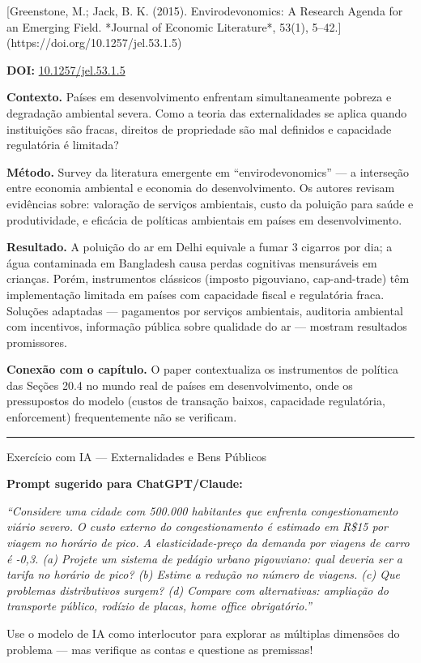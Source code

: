 \documentclass[11pt,twoside,openright]{book}
\begin{document}
\begin{pesquisabox}{[Greenstone, M.; Jack, B. K. (2015). Envirodevonomics: A Research Agenda for an Emerging Field. *Journal of Economic Literature*, 53(1), 5–42.](https://doi.org/10.1257/jel.53.1.5)}

\textbf{DOI:}
\href{https://doi.org/10.1257/jel.53.1.5}{10.1257/jel.53.1.5}

\textbf{Contexto.} Países em desenvolvimento enfrentam simultaneamente
pobreza e degradação ambiental severa. Como a teoria das externalidades
se aplica quando instituições são fracas, direitos de propriedade são
mal definidos e capacidade regulatória é limitada?

\textbf{Método.} Survey da literatura emergente em ``envirodevonomics''
--- a interseção entre economia ambiental e economia do desenvolvimento.
Os autores revisam evidências sobre: valoração de serviços ambientais,
custo da poluição para saúde e produtividade, e eficácia de políticas
ambientais em países em desenvolvimento.

\textbf{Resultado.} A poluição do ar em Delhi equivale a fumar 3
cigarros por dia; a água contaminada em Bangladesh causa perdas
cognitivas mensuráveis em crianças. Porém, instrumentos clássicos
(imposto pigouviano, cap-and-trade) têm implementação limitada em países
com capacidade fiscal e regulatória fraca. Soluções adaptadas ---
pagamentos por serviços ambientais, auditoria ambiental com incentivos,
informação pública sobre qualidade do ar --- mostram resultados
promissores.

\textbf{Conexão com o capítulo.} O paper contextualiza os instrumentos
de política das Seções 20.4 no mundo real de países em desenvolvimento,
onde os pressupostos do modelo (custos de transação baixos, capacidade
regulatória, enforcement) frequentemente não se verificam.

\end{pesquisabox}

\begin{center}\rule{0.5\linewidth}{0.5pt}\end{center}

\begin{tipbox}{Exercício com IA — Externalidades e Bens Públicos}

\textbf{Prompt sugerido para ChatGPT/Claude:}

\emph{``Considere uma cidade com 500.000 habitantes que enfrenta
congestionamento viário severo. O custo externo do congestionamento é
estimado em R\$15 por viagem no horário de pico. A elasticidade-preço da
demanda por viagens de carro é -0,3. (a) Projete um sistema de pedágio
urbano pigouviano: qual deveria ser a tarifa no horário de pico? (b)
Estime a redução no número de viagens. (c) Que problemas distributivos
surgem? (d) Compare com alternativas: ampliação do transporte público,
rodízio de placas, home office obrigatório.''}

Use o modelo de IA como interlocutor para explorar as múltiplas
dimensões do problema --- mas verifique as contas e questione as
premissas!

\end{tipbox}
\end{document}
